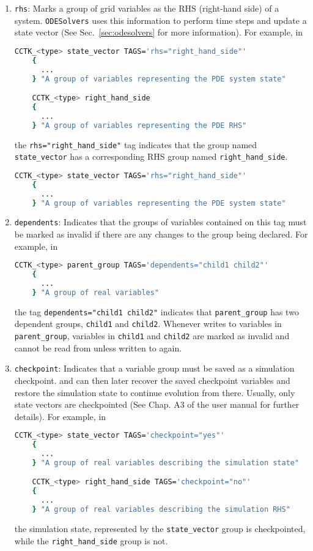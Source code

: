 \begin{enumerate}
  \item \texttt{rhs}: Marks a group of grid variables as the RHS (right-hand side) of a system. \texttt{ODESolvers} uses this information to perform time steps and update a state vector (See Sec.~\ref{sec:odesolvers} for more information). For example, in
  \begin{lstlisting}[language=bash]
    CCTK_<type> state_vector TAGS='rhs="right_hand_side"'
    {
      ...
    } "A group of variables representing the PDE system state"

    CCTK_<type> right_hand_side
    {
      ...
    } "A group of variables representing the PDE RHS"
  \end{lstlisting}
  the \texttt{rhs="right\_hand\_side"} tag indicates that the group named \texttt{state\_vector} has a corresponding RHS group named \texttt{right\_hand\_side}.

  \begin{lstlisting}[language=bash]
    CCTK_<type> state_vector TAGS='rhs="right_hand_side"'
    {
      ...
    } "A group of variables representing the PDE system state"
  \end{lstlisting}
  
  \item \texttt{dependents}: Indicates that the groups of variables contained on this tag must be marked as invalid if there are any changes to the group being declared. For example, in
  \begin{lstlisting}[language=bash]
    CCTK_<type> parent_group TAGS='dependents="child1 child2"'
    {
      ...
    } "A group of real variables"
  \end{lstlisting}
  the tag \texttt{dependents="child1 child2"} indicates that \texttt{parent\_group} has two dependent groups, \texttt{child1} and \texttt{child2}. Whenever \CarpetX\space writes to variables in \texttt{parent\_group}, variables in \texttt{child1} and \texttt{child2} are marked as invalid and cannot be read from unless written to again.
  
  \item \texttt{checkpoint}: Indicates that a variable group must be saved as a simulation checkpoint. \Cactus\space and \CarpetX\space can then later recover the saved checkpoint variables and restore the simulation state to continue evolution from there. Usually, only state vectors are checkpointed (See Chap. A3 of the \Cactus user manual for further details). For example, in
  \begin{lstlisting}[language=bash]
    CCTK_<type> state_vector TAGS='checkpoint="yes"'
    {
      ...
    } "A group of real variables describing the simulation state"

    CCTK_<type> right_hand_side TAGS='checkpoint="no"'
    {
      ...
    } "A group of real variables describing the simulation RHS"
  \end{lstlisting}
  the simulation state, represented by the \texttt{state\_vector} group is checkpointed, while the \texttt{right\_hand\_side} group is not.
\end{enumerate}